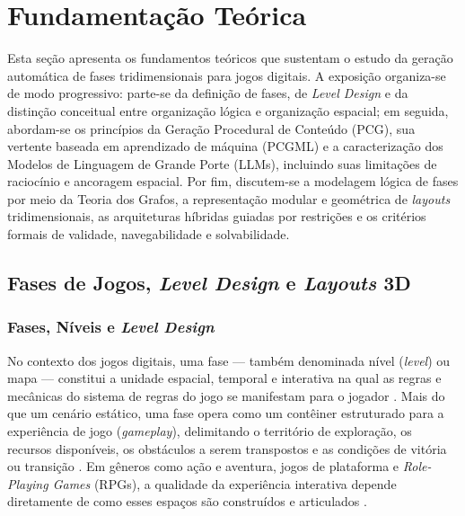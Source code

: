 \section{Fundamentação Teórica}
\label{sec:fundamentacao}

Esta seção apresenta os fundamentos teóricos que sustentam o estudo da geração automática de fases tridimensionais para jogos digitais. A exposição organiza-se de modo progressivo: parte-se da definição de fases, de \textit{Level Design} e da distinção conceitual entre organização lógica e organização espacial; em seguida, abordam-se os princípios da Geração Procedural de Conteúdo (PCG), sua vertente baseada em aprendizado de máquina (PCGML) e a caracterização dos Modelos de Linguagem de Grande Porte (LLMs), incluindo suas limitações de raciocínio e ancoragem espacial. Por fim, discutem-se a modelagem lógica de fases por meio da Teoria dos Grafos, a representação modular e geométrica de \textit{layouts} tridimensionais, as arquiteturas híbridas guiadas por restrições e os critérios formais de validade, navegabilidade e solvabilidade.

\subsection{Fases de Jogos, \textit{Level Design} e \textit{Layouts} 3D}
\label{sec:level_design}

\subsubsection{Fases, Níveis e \textit{Level Design}}
\label{sec:fases_niveis}

No contexto dos jogos digitais, uma fase --- também denominada nível (\textit{level}) ou mapa --- constitui a unidade espacial, temporal e interativa na qual as regras e mecânicas do sistema de regras do jogo se manifestam para o jogador \cite{tanagra, pcgbook}. Mais do que um cenário estático, uma fase opera como um contêiner estruturado para a experiência de jogo (\textit{gameplay}), delimitando o território de exploração, os recursos disponíveis, os obstáculos a serem transpostos e as condições de vitória ou transição \cite{tanagra, linden2014dungeons}. Em gêneros como ação e aventura, jogos de plataforma e \textit{Role-Playing Games} (RPGs), a qualidade da experiência interativa depende diretamente de como esses espaços são construídos e articulados \cite{dormans2010, linden2014dungeons}.

